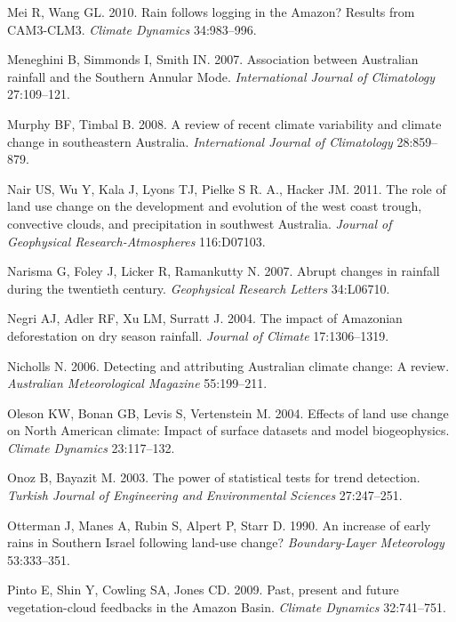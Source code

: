 \documentclass[fleqn,10pt,lineno]{wlpeerj} %
\theoremstyle{definition}
\theoremstyle{definition}
\theoremstyle{definition}
\theoremstyle{remark}
\begin{document}
\hypertarget{ref-Mei2010}{}
Mei R, Wang GL. 2010. Rain follows logging in the Amazon? Results from
CAM3-CLM3. \emph{Climate Dynamics} 34:983--996.

\hypertarget{ref-Meneghini2007}{}
Meneghini B, Simmonds I, Smith IN. 2007. Association between Australian
rainfall and the Southern Annular Mode. \emph{International Journal of
Climatology} 27:109--121.

\hypertarget{ref-Murphy2008}{}
Murphy BF, Timbal B. 2008. A review of recent climate variability and
climate change in southeastern Australia. \emph{International Journal of
Climatology} 28:859--879.

\hypertarget{ref-Nair2011}{}
Nair US, Wu Y, Kala J, Lyons TJ, Pielke S R. A., Hacker JM. 2011. The
role of land use change on the development and evolution of the west
coast trough, convective clouds, and precipitation in southwest
Australia. \emph{Journal of Geophysical Research-Atmospheres}
116:D07103.

\hypertarget{ref-Narisma2007}{}
Narisma G, Foley J, Licker R, Ramankutty N. 2007. Abrupt changes in
rainfall during the twentieth century. \emph{Geophysical Research
Letters} 34:L06710.

\hypertarget{ref-Negri2004}{}
Negri AJ, Adler RF, Xu LM, Surratt J. 2004. The impact of Amazonian
deforestation on dry season rainfall. \emph{Journal of Climate}
17:1306--1319.

\hypertarget{ref-Nicholls2006}{}
Nicholls N. 2006. Detecting and attributing Australian climate change: A
review. \emph{Australian Meteorological Magazine} 55:199--211.

\hypertarget{ref-Oleson2004}{}
Oleson KW, Bonan GB, Levis S, Vertenstein M. 2004. Effects of land use
change on North American climate: Impact of surface datasets and model
biogeophysics. \emph{Climate Dynamics} 23:117--132.

\hypertarget{ref-Onoz2003}{}
Onoz B, Bayazit M. 2003. The power of statistical tests for trend
detection. \emph{Turkish Journal of Engineering and Environmental
Sciences} 27:247--251.

\hypertarget{ref-Otterman1990}{}
Otterman J, Manes A, Rubin S, Alpert P, Starr D. 1990. An increase of
early rains in Southern Israel following land-use change?
\emph{Boundary-Layer Meteorology} 53:333--351.

\hypertarget{ref-Pinto2009}{}
Pinto E, Shin Y, Cowling SA, Jones CD. 2009. Past, present and future
vegetation-cloud feedbacks in the Amazon Basin. \emph{Climate Dynamics}
32:741--751.
\end{document}
